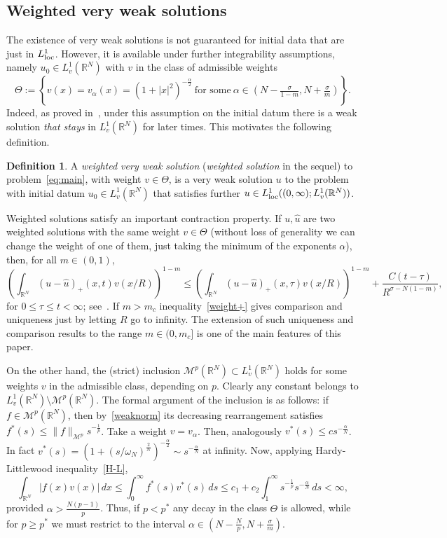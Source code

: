 \documentclass[leqno,12pt]{amsart}
\theoremstyle{definition}
\newtheorem{definition}[theorem]{Definition}
\theoremstyle{remark}
\numberwithin{equation}{section}
\begin{document}
\subsection*{Weighted very weak solutions}

The existence of very weak solutions is not guaranteed for initial data that are just in  $L^1_{\rm loc}$.
However, it is available under further integrability assumptions, namely $u_0\in L^1_v(\mathbb{R}^N)$ with $v$ in the class of admissible weights
\[
 \Theta:=\left\{v(x)=v_\alpha(x)=(1+|x|^2)^{-\frac\alpha2}\ \text{for some}\ \alpha\in\left(N-\tfrac{\sigma}{1-m},N+\tfrac{\sigma}{m}\right)\right\}.
\]
Indeed, as proved in~\cite{b3}, under this assumption on the initial datum there is a weak solution \emph{that stays} in $L^1_v(\mathbb{R}^N)$ for later times. This motivates the following definition.
\begin{definition}\label{vww:definition}
    A \emph{weighted very weak solution} (\emph{weighted solution} in the sequel) to problem~\eqref{eq:main}, with weight $v\in\Theta$, is a very weak solution $u$ to the problem  with initial datum $u_0 \in L^1_v(\mathbb{R}^N)$  that satisfies further
    $u\in L^1_{\textup{loc}}((0,\infty);L^1_{v}({\mathbb{R}^N}))$. 
\end{definition}

Weighted solutions satisfy an important contraction property. If $u,\hat{u}$ are two weighted solutions with the same weight $v\in \Theta$ (without loss of generality we can change the weight of one of them, just taking the minimum of the exponents $\alpha$), then, for all $m\in(0,1)$,
\begin{equation}\label{weight+}
    \left(\int_{\mathbb{R}^N}(u-\hat{u})_+(x,t)v(x/R)\right)^{1-m}\leq \left(\int_{\mathbb{R}^N}(u-\hat{u})_+(x,\tau)v(x/R)\right)^{1-m}+\frac{C(t-\tau)}{R^{\sigma-N(1-m)}},
\end{equation}
for $0\leq\tau\leq t<\infty$; see~\cite[Theorem 3.5]{jorge}.
If $m>m_c$ inequality~\eqref{weight+} gives comparison and uniqueness just by letting $R$ go to infinity. The extension of such uniqueness and comparison results to the range $m\in(0,m_c]$ is one of the main features of this paper. 

On the other hand, the (strict) inclusion $\mathcal{M}^p(\mathbb{R}^N)\subset L^1_v(\mathbb{R}^N)$ holds
for some weights $v$ in the admissible class, depending on $p$. Clearly any constant belongs to $L^1_v(\mathbb{R}^N)\setminus\mathcal{M}^p(\mathbb{R}^N)$.  The formal argument of the inclusion is as follows: if $f\in \mathcal{M}^p(\mathbb{R}^N)$, then by~\eqref{weaknorm} its decreasing rearrangement satisfies $f^*(s)\le \|f\|_{\mathcal{M}^p}s^{-\frac1p}$. Take a weight $v=v_\alpha$. Then, analogously $v^*(s)\le c s^{-\frac\alpha N}$. In fact $v^*(s)=(1+(s/\omega_N)^{\frac2N})^{-\frac\alpha2}\sim  s^{-\frac\alpha N}$ at infinity. Now, applying Hardy-Littlewood inequality~\eqref{H-L},
$$
\int_{\mathbb{R}^N}|f(x)v(x)|\,dx\le \int_0^\infty f^*(s)v^*(s)\,ds\le c_1+c_2\int_1^\infty s^{-\frac1p}s^{-\frac\alpha N}\,ds<\infty,
$$
provided $\alpha>\frac{N(p-1)}p$. Thus, if $p<p^*$ any decay in the class $\Theta$ is allowed, while for $p\ge p^*$ we must restrict to the interval $\alpha\in(N-\frac{N}{p},N+\frac \sigma m)$. 
\end{document}
